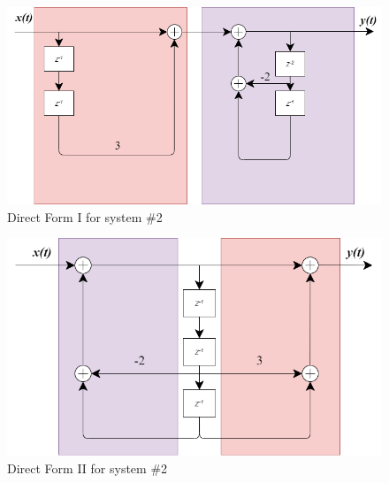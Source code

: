 \documentclass[12pt,letterpaper]{article}
\begin{document}
\begin{figure}[!htb]
    \centering
    \includegraphics[scale = 0.6]{figures/HW1Q5b2.png}
    \caption{Direct Form I for system \#2}
    \label{5a}
\end{figure}
\begin{figure}[!htb]
    \centering
    \includegraphics[scale = 0.6]{figures/HW1Q5b4.png}
    \caption{Direct Form II for system \#2}
    \label{5a}
\end{figure}



\end{document}
